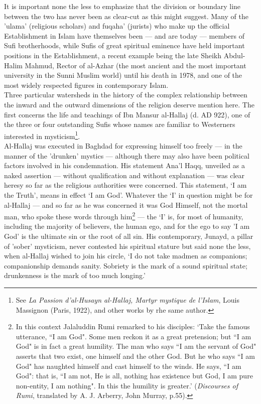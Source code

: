 \documentclass[10pt, twoside]{book}
\begin{document}
It is important none the less to emphasize that the division or boundary line between the two has 
never been as clear\hyp{}cut as this might suggest. Many of the 'ulama' (religious scholars) and fuqaha' 
(jurists) who make up the official Establishment in Islam have themselves been --- and are today --- 
members of Sufi brotherhoods, while Sufis of great spiritual eminence have held important positions 
in the Establishment, a recent example being the late Sheikh Abdul\hyp{}Halim Mahmud, Rector of al\hyp{}Azhar 
(the most ancient and the most important university in the Sunni Muslim world) until his death in 
1978, and one of the most widely respected figures in contemporary Islam. \\

Three particular watersheds in the history of the complex relationship between the inward and the 
outward dimensions of the religion deserve mention here. The first concerns the life and teachings of 
Ibn Mansur al\hyp{}Hallaj (d. AD 922), one of the three or four outstanding Sufis whose names are familiar 
to Westerners interested in mysticism\footnote{See \emph{La Passion d'al\hyp{}Husayn al\hyp{}Hallaj, Martyr mystique de l'Islam}, Louis Massignon (Paris, 1922), and other works by rhe same author.}.\\

Al-Hallaj was executed in Baghdad for expressing himself too freely --- in the manner of the 'drunken' 
mystics --- although there may also have been political factors involved in his condemnation. His 
statement Ana'l Haqq, unveiled as a naked assertion --- without qualification and without explanation --- 
was clear heresy so far as the religious authorities were concerned. This statement, `I am the 
Truth', means in effect `I am God'. Whatever the `I' in question might be for al-Hallaj --- and so far 
as he was concerned it was God Himself, not the mortal man, who spoke these words through him\footnote{In this context Jalaluddin Rumi remarked to his disciples: `Take the famous utterance, ``I am God". Some men reckon it as a great pretension; but ``I am God" is in fact a great humility. The man who 
says ``I am the servant of God" asserts that two exist, one himself and the other God. But he who says 
``I am God" has naughted himself and cast himself to the winds. He says, ``I am God": that is, ``I am 
not, He is all, nothing has existence but God, I am pure non\hyp{}entity, I am nothing". In this the 
humility is greater.' (\emph{Discourses of Rumi}, translated by A. J. Arberry, John Murray, p.55).} --- 
the `I' is, for most of humanity, including the majority of believers, the human ego, and for the ego 
to say 'I am God' is the ultimate sin or the root of all sin. His contemporary, Junayd, a pillar of 
'sober' mysticism, never contested his spiritual stature but said none the less, when al\hyp{}Hallaj 
wished to join his circle, `I do not take madmen as companions; companionship demands sanity. 
Sobriety is the mark of a sound spiritual state; drunkenness is the mark of too much longing.' \\
\end{document}
